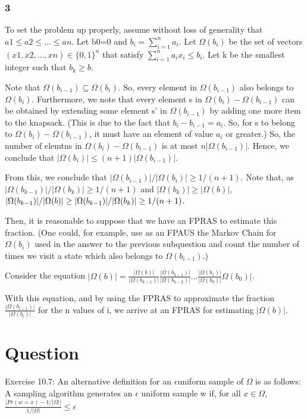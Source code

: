 \documentclass[10pt]{amsart}
\theoremstyle{remark}
\begin{document}
\subsubsection{3}
To set the problem up properly, assume without loss of generality that $a1\leq a2 \leq ... \leq an$. Let b0=0 and $b_{i}=\sum_{i=1}^{n}a_{i}$. Let $\Omega(b_{i})$ be the set of vectors $(x1, x2,\dots, xn)\in\{0, 1\}^{n}$ that satisfy $\sum_{i=1}^{n}a_{i}x_{i}\leq b_{i}$. Let k be the smallest integer such that $b_{k}\geq b$. 

Note that $\Omega(b_{i-1}) \subseteq \Omega(b_{i})$. So, every element in $\Omega(b_{i-1})$ also belongs to $\Omega(b_{i})$. Furthermore, we note that every element s in $\Omega(b_{i}) - \Omega(b_{i-1})$ can be obtained by extending some element s' in $\Omega(b_{i-1})$ by adding one more item to the knapsack. (This is due to the fact that $b_{i}-b_{i-1}=a_{i}$. So, for s to belong to $\Omega(b_{i}) - \Omega(b_{i-1})$, it must have an element of value $a_{i}$ or greater.) So, the number of elemtns in $\Omega(b_{i}) - \Omega(b_{i-1})$ is at most $n|\Omega(b_{i-1})|$. Hence, we conclude that $|\Omega(b_{i})|\leq (n+1)|\Omega(b_{i-1})|$.

From this, we conclude that $|\Omega(b_{i-1})| /|\Omega(b_{i})| \geq 1/(n+1)$. Note that, as $|\Omega(b_{k-1})| /|\Omega(b_{k})| \geq 1/(n+1)$ and $|\Omega(b_{k})| \geq |\Omega(b)|$, $|\Omega(b_{k-1})| /|\Omega(b)| \geq \\
|\Omega(b_{k-1})| /|\Omega(b_{k})| \geq 1/(n+1)$.

Then, it is reasonable to suppose that we have an FPRAS to estimate this fraction. (One could, for example, use as an FPAUS the Markov Chain for $\Omega(b_{i})$ used in the answer to the previous subquestion and count the number of times we visit a state which also belongs to $\Omega(b_{i-1})$.)

Consider the equation
$|\Omega(b)|=\frac{|\Omega(b)|}{|\Omega(b_{k-1})|} \frac{|\Omega(b_{k-1})|}{|\Omega(b_{k-2})|} \dots \frac{|\Omega(b_{1})|}{|\Omega(b_{0})|}\Omega(b_{0})|$.

With this equation, and by using the FPRAS to approximate the fraction $\frac{|\Omega(b_{i-1})|}{ |\Omega(b_{i})|}$ for the n values of i, we arrive at an FPRAS for estimating $|\Omega(b)|$.

\section{Question}
Exercise 10.7: An alternative definition for an $\epsilon $uniform sample of $\Omega$ is as follows: A sampling algorithm generates an $\epsilon$ uniform sample w if, for all $x\in \Omega$,
$\frac{|Pr(w=x)-1/|\Omega||}{1/|\Omega|} \leq \epsilon $
\end{document}

